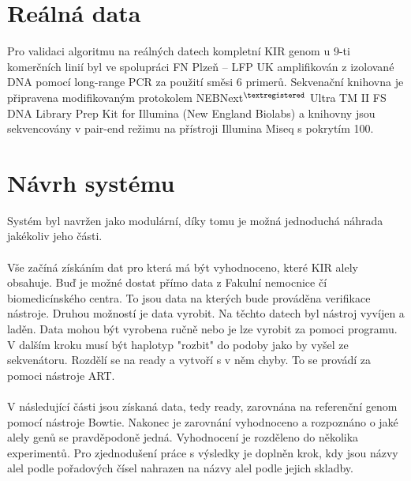 \documentclass[czech,DP]{thesiskiv}
\numberwithin{equation}{section}
\begin{document}
\section{Reálná data}
Pro validaci algoritmu na reálných datech kompletní KIR genom u 9-ti komerčních linií byl ve spolupráci FN Plzeň – LFP UK amplifikován z izolované DNA pomocí long-range PCR za použití směsi 6 primerů. Sekvenační knihovna je připravena modifikovaným protokolem NEBNext$^{\textregistered}$ Ultra TM II FS DNA Library Prep Kit for Illumina (New England Biolabs) a knihovny jsou sekvencovány v pair-end režimu na přístroji Illumina Miseq s pokrytím 100. \cite{real_data}

\section{Návrh systému}
Systém byl navržen jako modulární, díky tomu je možná jednoduchá náhrada jakékoliv jeho části. 
\\
\\ 
Vše začíná získáním dat pro která má být vyhodnoceno, které KIR alely obsahuje. Buď je možné dostat přímo data z Fakulní nemocnice čí biomedicínského centra. To jsou data na kterých bude prováděna verifikace nástroje. Druhou možností je data vyrobit. Na těchto datech byl nástroj vyvíjen a laděn. Data mohou být vyrobena ručně nebo je lze vyrobit za pomoci programu. V dalším kroku musí být haplotyp "rozbit" do podoby jako by vyšel ze sekvenátoru. Rozdělí se na ready a vytvoří s v něm chyby. To se provádí za pomoci nástroje ART.
\\
\\
V následující části jsou získaná data, tedy ready, zarovnána na referenční genom pomocí nástroje Bowtie. Nakonec je zarovnání vyhodnoceno a rozpoznáno o jaké alely genů se pravděpodoně jedná. Vyhodnocení je rozděleno do několika experimentů. Pro zjednodušení práce s výsledky je doplněn krok, kdy jsou názvy alel podle pořadových čísel nahrazen na názvy alel podle jejich skladby.
\end{document}
